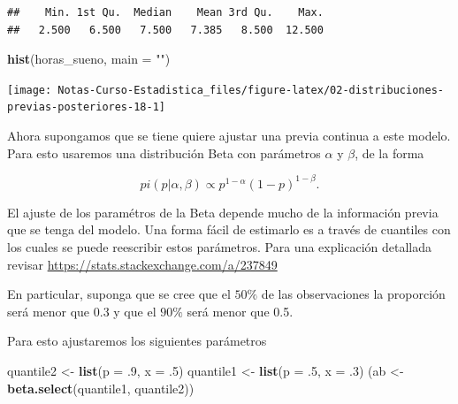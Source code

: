 \documentclass[
  12pt,
]{book}
\newenvironment{Shaded}{\begin{snugshade}}{\end{snugshade}}
\newcommand{\DataTypeTok}[1]{\textcolor[rgb]{0.13,0.29,0.53}{#1}}
\newcommand{\FloatTok}[1]{\textcolor[rgb]{0.00,0.00,0.81}{#1}}
\newcommand{\KeywordTok}[1]{\textcolor[rgb]{0.13,0.29,0.53}{\textbf{#1}}}
\newcommand{\NormalTok}[1]{#1}
\newcommand{\OperatorTok}[1]{\textcolor[rgb]{0.81,0.36,0.00}{\textbf{#1}}}
\newcommand{\StringTok}[1]{\textcolor[rgb]{0.31,0.60,0.02}{#1}}
\begin{document}
\begin{Shaded}
\end{Shaded}

\begin{verbatim}
##    Min. 1st Qu.  Median    Mean 3rd Qu.    Max. 
##   2.500   6.500   7.500   7.385   8.500  12.500
\end{verbatim}

\begin{Shaded}
\begin{Highlighting}[]
\KeywordTok{hist}\NormalTok{(horas\_sueno, }\DataTypeTok{main =} \StringTok{""}\NormalTok{)}
\end{Highlighting}
\end{Shaded}

\begin{center}\texttt{[image: Notas-Curso-Estadistica\_files/figure-latex/02-distribuciones-previas-posteriores-18-1]} \end{center}

Ahora supongamos que se tiene quiere ajustar una previa continua a este modelo. Para esto usaremos una distribución Beta con parámetros \(\alpha\) y \(\beta\), de la forma

\[
pi(p\vert \alpha, \beta) \propto p^{1-\alpha} (1-p)^{1-\beta}.
\]

El ajuste de los paramétros de la Beta depende mucho de la información previa que se tenga del modelo. Una forma fácil de estimarlo es a través de cuantiles con los cuales se puede reescribir estos parámetros. Para una explicación detallada revisar \url{https://stats.stackexchange.com/a/237849}

En particular, suponga que se cree que el \(50\%\) de las observaciones la proporción será menor que 0.3 y que el \(90\%\) será menor que 0.5.

Para esto ajustaremos los siguientes parámetros

\begin{Shaded}
\begin{Highlighting}[]
\NormalTok{quantile2 \textless{}{-}}\StringTok{ }\KeywordTok{list}\NormalTok{(}\DataTypeTok{p =} \FloatTok{.9}\NormalTok{, }\DataTypeTok{x =} \FloatTok{.5}\NormalTok{)}
\NormalTok{quantile1 \textless{}{-}}\StringTok{ }\KeywordTok{list}\NormalTok{(}\DataTypeTok{p =} \FloatTok{.5}\NormalTok{, }\DataTypeTok{x =} \FloatTok{.3}\NormalTok{)}
\NormalTok{(ab \textless{}{-}}\StringTok{ }\KeywordTok{beta.select}\NormalTok{(quantile1, quantile2))}
\end{Highlighting}
\end{Shaded}
\end{document}
